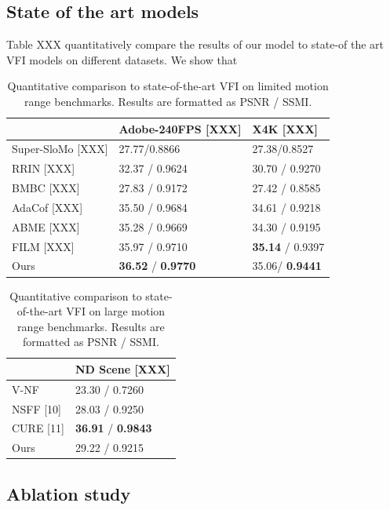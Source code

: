\documentclass{article}
\begin{document}
\subsection{State of the art models}

Table XXX quantitatively compare the results of our model to state-of the art VFI models on different datasets.
We show that


\begin{table}[]
\centering
\caption{Quantitative comparison to state-of-the-art VFI on limited motion range benchmarks. Results are formatted as PSNR / SSMI.}
\begin{tabular}{l | l | l }
 &  Adobe-240FPS  [XXX] &  X4K [XXX]  \\
\hline
Super-SloMo [XXX] &  27.77/0.8866 & 27.38/0.8527  \\
RRIN [XXX]  & 32.37 / 0.9624 & 30.70 / 0.9270  \\
BMBC [XXX]  & 27.83 / 0.9172 & 27.42 / 0.8585   \\
AdaCof [XXX] & 35.50 / 0.9684 & 34.61 / 0.9218 \\
ABME   [XXX] & 35.28 / 0.9669 & 34.30 / 0.9195 \\
FILM   [XXX] &	35.97 / 0.9710 & \textbf{35.14} / 0.9397 \\
Ours	& \textbf{36.52} / \textbf{0.9770} & 35.06/ \textbf{0.9441} \\
\end{tabular}
\end{table}



\begin{table}[]
\centering
\caption{Quantitative comparison to state-of-the-art VFI on large motion range benchmarks. Results are formatted as PSNR / SSMI.}
\begin{tabular}{l | l }
	    &   ND Scene [XXX] \\
\hline
V-NF        &  23.30 / 0.7260 \\
NSFF [10]   & 28.03 / 0.9250 \\
CURE [11]   & \textbf{36.91} / \textbf{0.9843} \\
Ours	      & 29.22 / 0.9215
\end{tabular}

\end{table}



\subsection{Ablation study}
\end{document}
